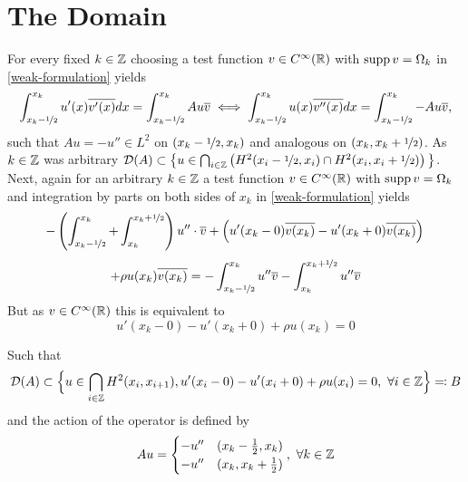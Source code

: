 \chapter{The Domain}

For every fixed $k \in \mathbb{Z}$ choosing a test function $v \in C^{\infty}(\mathbb{R})$ with $\operatorname{supp} v = \Omega_{k}$  in \eqref{weak-formulation} yields
	\[ \int_{x_{k}-\nicefrac{1}{2}}^{x_{k}} u'(x) \overline{v'(x)} dx = \int_{x_{k}-\nicefrac{1}{2}}^{x_{k}} A u \overline{v} \iff \int_{x_{k}-\nicefrac{1}{2}}^{x_{k}} u(x) \overline{v''(x)} dx = \int_{x_{k}-\nicefrac{1}{2}}^{x_{k}} - A u \overline{v}, \]
such that $A u = - u'' \in L^{2}$ on $(x_{k} -\nicefrac{1}{2}, x_{k})$ and analogous on $(x_{k}, x_{k} + \nicefrac{1}{2})$.
As $k \in \mathbb{Z}$ was arbitrary $\mathcal{D}(A) \subset \big\{ u \in \bigcap_{i \in \mathbb{Z}} \left( H^{2}(x_{i}-\nicefrac{1}{2}, x_{i}) \cap H^{2}(x_{i}, x_{i} + \nicefrac{1}{2}) \right)\big\}$. \\

Next, again for an arbitrary $k \in \mathbb{Z}$ a test function $v \in C^{\infty}(\mathbb{R})$ with $\operatorname{supp} v = \Omega_{k}$ and integration by parts on both sides of $x_{k}$ in \eqref{weak-formulation} yields
	\[ -\left( \int_{x_{k}-\nicefrac{1}{2}}^{x_{k}} + \int_{x_{k}}^{x_{k} + \nicefrac{1}{2}}\right) u'' \cdot \overline{v} + \left( u'(x_{k}-0) \overline{v(x_{k})} - u'(x_{k} + 0) \overline{v(x_{k})} \right) \\ \]
	\[ +  \rho u(x_{k})\overline{v(x_{k})} = - \int_{x_{k} - \nicefrac{1}{2}}^{x_{k}} u'' \overline{v} - \int_{x_{k}}^{x_{k} + \nicefrac{1}{2}} u'' \overline{v} \]
But as $v \in C^{\infty}(\mathbb{R})$ this is equivalent to
	\[ u'(x_{k}-0) - u'(x_{k}+0) + \rho u(x_{k}) = 0 \]
	
Such that
	\begin{align*}
		\mathcal{D}(A) \subset \Big\{ u \in \bigcap_{i \in \mathbb{Z}} H^{2}(x_{i}, x_{i + 1}), u'(x_{i} - 0) - u'(x_{i} + 0) + \rho u(x_{i}) = 0 , ~\forall i \in \mathbb{Z} \Big\} \eqqcolon B
	\end{align*} 
and the action of the operator is defined by
	\[ A u = \begin{cases}
					- u'' & (x_{k} - \frac{1}{2}, x_{k}) \\
					- u'' & (x_{k}, x_{k} + \frac{1}{2})
				\end{cases}, ~\forall k \in \mathbb{Z} \]
				
